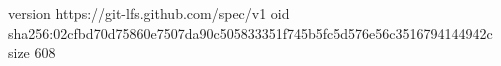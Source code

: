 version https://git-lfs.github.com/spec/v1
oid sha256:02cfbd70d75860e7507da90c505833351f745b5fc5d576e56c3516794144942c
size 608
